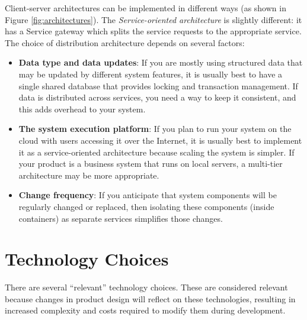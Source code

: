 Client-server architectures can be implemented in different ways (as shown in Figure \ref{fig:architectures}). The \textit{Service-oriented architecture} is slightly different: it has a Service gateway which splits the service requests to the appropriate service.
\newline\noindent
The choice of distribution architecture depends on several factors:
\begin{itemize}
    \item \textbf{Data type and data updates}: If you are mostly using structured data that may be updated by different system features, it is usually best to have a single shared database that provides locking and transaction management. If data is distributed across services, you need a way to keep it consistent, and this adds overhead to your system.
    \item \textbf{The system execution platform}: If you plan to run your system on the cloud with users accessing it over the Internet, it is usually best to implement it as a service-oriented architecture because scaling the system is simpler. If your product is a business system that runs on local servers, a multi-tier architecture may be more appropriate.
    \item \textbf{Change frequency}: If you anticipate that system components will be regularly changed or replaced, then isolating these components (inside containers) as separate services simplifies those changes.
\end{itemize}

\section{Technology Choices}

There are several ``relevant'' technology choices. These are considered relevant because changes in product design will reflect on these technologies, resulting in increased complexity and costs required to modify them during development.

